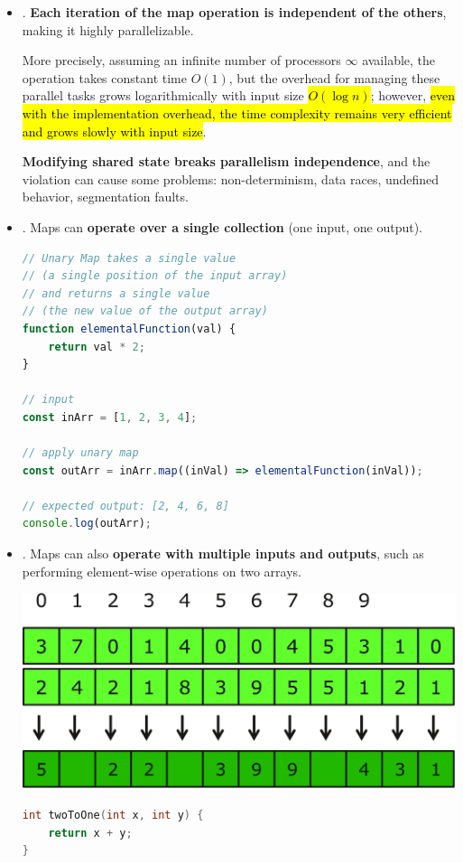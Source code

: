 \begin{itemize}
    \item {}. \textbf{Each iteration of the map operation is independent of the others}, making it highly parallelizable.
    
    More precisely, assuming an infinite number of processors $\infty$ available, the operation takes constant time $O(1)$, but the overhead for managing these parallel tasks grows logarithmically with input size \hl{$O\left(\log n\right)$}; however, \hl{even with the implementation overhead, the time complexity remains very efficient and grows slowly with input size}.

    \textbf{Modifying shared state breaks parallelism independence}, and the violation can cause some problems: non-determinism, data races, undefined behavior, segmentation faults.

    \item {}. Maps can \textbf{operate over a single collection} (one input, one output).
    \begin{examplebox}
        \begin{lstlisting}[language=JavaScript]
// Unary Map takes a single value
// (a single position of the input array)
// and returns a single value
// (the new value of the output array)
function elementalFunction(val) {
    return val * 2;
}

// input
const inArr = [1, 2, 3, 4];

// apply unary map
const outArr = inArr.map((inVal) => elementalFunction(inVal));

// expected output: [2, 4, 6, 8]
console.log(outArr);\end{lstlisting}
    \end{examplebox}

    \newpage

    \item {}. Maps can also \textbf{operate with multiple inputs and outputs}, such as performing element-wise operations on two arrays.
    \begin{examplebox}
        \begin{center}
            \includegraphics[width=.7\textwidth]{img/n-ary-map-pattern-1.pdf}
        \end{center}
        \begin{lstlisting}[language=c]
int twoToOne(int x, int y) {
    return x + y;
}\end{lstlisting}
    \end{examplebox}
\end{itemize}
